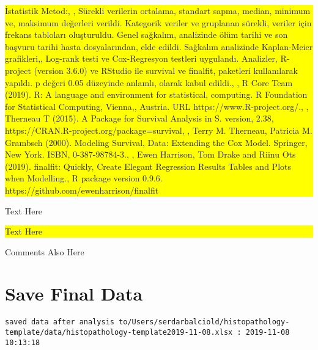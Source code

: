 \documentclass[]{article}
\begin{document}
\colorbox{yellow}{
\parbox{\dimexpr\linewidth-2\fboxsep}{

İstatistik Metod:, , Sürekli verilerin ortalama, standart sapma, median, minimum ve, maksimum değerleri verildi. Kategorik veriler ve gruplanan sürekli, veriler için frekans tabloları oluşturuldu. Genel sağkalım, analizinde ölüm tarihi ve son başvuru tarihi hasta dosyalarından, elde edildi.  Sağkalım analizinde Kaplan-Meier grafikleri,, Log-rank testi ve Cox-Regresyon testleri uygulandı. Analizler, R-project (version 3.6.0) ve RStudio ile survival ve finalfit, paketleri kullanılarak yapıldı. p değeri 0.05 düzeyinde anlamlı, olarak kabul edildi., , R Core Team (2019). R: A language and environment for statistical, computing. R Foundation for Statistical Computing, Vienna,, Austria. URL https://www.R-project.org/., , Therneau T (2015). A Package for Survival Analysis in S. version, 2.38, https://CRAN.R-project.org/package=survival, , Terry M. Therneau, Patricia M. Grambsch (2000). Modeling Survival, Data: Extending the Cox Model. Springer, New York. ISBN, 0-387-98784-3., , Ewen Harrison, Tom Drake and Riinu Ots (2019). finalfit: Quickly, Create Elegant Regression Results Tables and Plots when Modelling., R package version 0.9.6. https://github.com/ewenharrison/finalfit

}
}

\pagebreak

Text Here

\noindent

\colorbox{yellow}{
\parbox{\dimexpr\linewidth-2\fboxsep}{

Text Here

}
}

\pagebreak

\pagecolor{yellow}\afterpage{\nopagecolor}

\pagebreak

\pagebreak

Comments Also Here

\pagebreak

\hypertarget{save-final-data}{%
\section{Save Final Data}\label{save-final-data}}

\begin{verbatim}
saved data after analysis to/Users/serdarbalciold/histopathology-template/data/histopathology-template2019-11-08.xlsx : 2019-11-08 10:13:18
\end{verbatim}
\end{document}
